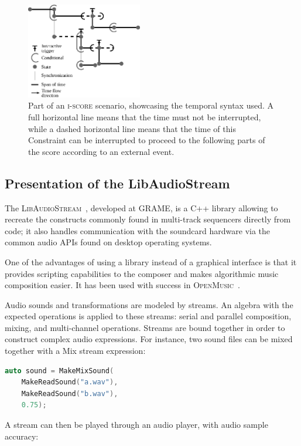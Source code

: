 \documentclass{article}
\newcommand*{\LibAudioStream}{\textsc{LibAudioStream}\xspace}
\newcommand*{\iscore}{\textsc{i-score}\xspace}
\newcommand*{\openmusic}{\textsc{OpenMusic}\xspace}
\begin{document}
\begin{figure}
	\centering
	\includegraphics[width=0.45\textwidth]{figures/iscore-example.eps}
	\caption{Part of an \iscore scenario, showcasing the temporal syntax used. 
		A full horizontal line means that the time must not be interrupted, 
		while a dashed horizontal line means that the time of this Constraint can be interrupted to proceed 
		to the following parts of the score according to an external event.}
	\label{fig.iscore-example}
\end{figure}

\subsection{Presentation of the LibAudioStream}
The \LibAudioStream~\cite{letzlibaudiostream}, developed at GRAME, is a C++ library allowing to recreate the constructs commonly found in multi-track sequencers directly from code; it also handles communication with the soundcard hardware via the common audio APIs found on desktop operating systems.

One of the advantages of using a library instead of a graphical interface is that it provides scripting capabilities to the composer and makes algorithmic music composition easier.
It has been used with success in \openmusic~\cite{bouche2014programmation}.

Audio sounds and transformations are modeled by streams. 
An algebra with the expected operations is applied to these streams: serial and parallel composition, mixing, and multi-channel operations.
Streams are bound together in order to construct complex audio expressions.
For instance, two sound files can be mixed together with a Mix stream expression: 
\begin{lstlisting}[language=C++,columns=fullflexible,basicstyle=\ttfamily]
auto sound = MakeMixSound(
    MakeReadSound("a.wav"), 
    MakeReadSound("b.wav"), 
    0.75);
\end{lstlisting}
A stream can then be played through an audio player, with audio sample accuracy:
 
\end{document}
